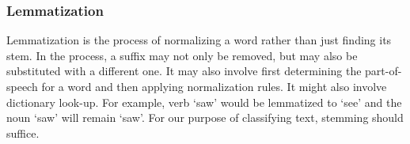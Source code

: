
\subsubsection{Lemmatization}

Lemmatization is the process of normalizing a word rather than just finding its
stem. In the process, a suffix may not only be removed, but may also be
substituted with a different one. It may also involve first determining the
part-of-speech for a word and then applying normalization rules. It might also
involve dictionary look-up. For example, verb ‘saw’ would be lemmatized to ‘see’
and the noun ‘saw’ will remain ‘saw’. For our purpose of classifying text,
stemming should suffice.
